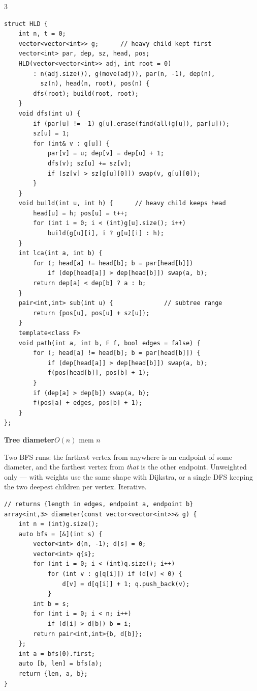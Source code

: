 \documentclass[9pt,a4paper]{extarticle}
\newcommand{\entry}[3]{%
  \addcontentsline{toc}{subsection}{#1}%
  \vspace{0.8ex}%
  \noindent\colorbox{hdbg}{\parbox{\dimexpr\columnwidth-2\fboxsep}{%
    \strut\textbf{#1}\hfill{\footnotesize\textsf{#2}}}}\par
  \vspace{0.4ex}%
  {\footnotesize #3\par}%
}
\begin{document}
\begin{multicols*}{3}
\begin{lstlisting}
struct HLD {
    int n, t = 0;
    vector<vector<int>> g;      // heavy child kept first
    vector<int> par, dep, sz, head, pos;
    HLD(vector<vector<int>> adj, int root = 0)
        : n(adj.size()), g(move(adj)), par(n, -1), dep(n),
          sz(n), head(n, root), pos(n) {
        dfs(root); build(root, root);
    }
    void dfs(int u) {
        if (par[u] != -1) g[u].erase(find(all(g[u]), par[u]));
        sz[u] = 1;
        for (int& v : g[u]) {
            par[v] = u; dep[v] = dep[u] + 1;
            dfs(v); sz[u] += sz[v];
            if (sz[v] > sz[g[u][0]]) swap(v, g[u][0]);
        }
    }
    void build(int u, int h) {      // heavy child keeps head
        head[u] = h; pos[u] = t++;
        for (int i = 0; i < (int)g[u].size(); i++)
            build(g[u][i], i ? g[u][i] : h);
    }
    int lca(int a, int b) {
        for (; head[a] != head[b]; b = par[head[b]])
            if (dep[head[a]] > dep[head[b]]) swap(a, b);
        return dep[a] < dep[b] ? a : b;
    }
    pair<int,int> sub(int u) {              // subtree range
        return {pos[u], pos[u] + sz[u]};
    }
    template<class F>
    void path(int a, int b, F f, bool edges = false) {
        for (; head[a] != head[b]; b = par[head[b]]) {
            if (dep[head[a]] > dep[head[b]]) swap(a, b);
            f(pos[head[b]], pos[b] + 1);
        }
        if (dep[a] > dep[b]) swap(a, b);
        f(pos[a] + edges, pos[b] + 1);
    }
};
\end{lstlisting}

\entry{Tree diameter}{$O(n)$ \quad mem $n$}{%
Two BFS runs: the farthest vertex from anywhere is an endpoint of some diameter, and
the farthest vertex from \emph{that} is the other endpoint. Unweighted only --- with
weights use the same shape with Dijkstra, or a single DFS keeping the two deepest
children per vertex. Iterative.}

\begin{lstlisting}
// returns {length in edges, endpoint a, endpoint b}
array<int,3> diameter(const vector<vector<int>>& g) {
    int n = (int)g.size();
    auto bfs = [&](int s) {
        vector<int> d(n, -1); d[s] = 0;
        vector<int> q{s};
        for (int i = 0; i < (int)q.size(); i++)
            for (int v : g[q[i]]) if (d[v] < 0) {
                d[v] = d[q[i]] + 1; q.push_back(v);
            }
        int b = s;
        for (int i = 0; i < n; i++)
            if (d[i] > d[b]) b = i;
        return pair<int,int>{b, d[b]};
    };
    int a = bfs(0).first;
    auto [b, len] = bfs(a);
    return {len, a, b};
}
\end{lstlisting}


\end{multicols*}
\end{document}
